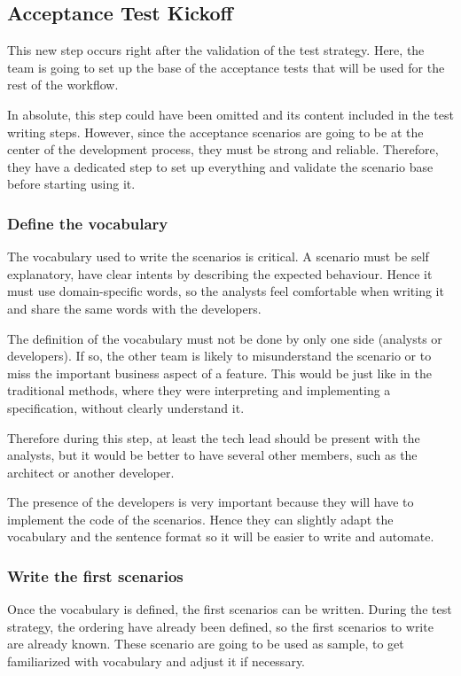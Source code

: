\subsection{Acceptance Test Kickoff}\label{subsec:acceptance-test-kickoff}
This new step occurs right after the validation of the test strategy.
Here, the team is going to set up the base of the acceptance tests that will
be used for the rest of the workflow.

In absolute, this step could have been omitted and its content included in
the test writing steps.
However, since the acceptance scenarios are going to be at the center of the
development process, they must be strong and reliable.
Therefore, they have a dedicated step to set up everything and validate the
scenario base before starting using it.

\subsubsection{Define the vocabulary}
The vocabulary used to write the scenarios is critical.
A scenario must be self explanatory, have clear intents by describing the
expected behaviour.
Hence it must use domain-specific words, so the analysts feel comfortable
when writing it and share the same words with the developers.

The definition of the vocabulary must not be done by only one side (analysts
or developers).
If so, the other team is likely to misunderstand the scenario or to miss the
important business aspect of a feature.
This would be just like in the traditional methods, where they were
interpreting and implementing a specification, without clearly understand it.

Therefore during this step, at least the tech lead should be present with the
analysts, but it would be better to have several other members, such as the
architect or another developer.

The presence of the developers is very important because they will have to
implement the code of the scenarios.
Hence they can slightly adapt the vocabulary and the sentence format so it
will be easier to write and automate.

\subsubsection{Write the first scenarios}
Once the vocabulary is defined, the first scenarios can be written.
During the test strategy, the ordering have already been defined, so the
first scenarios to write are already known.
These scenario are going to be used as sample, to get familiarized
with vocabulary and adjust it if necessary.

